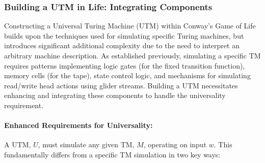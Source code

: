 \documentclass{article}
\theoremstyle{definition}
\theoremstyle{plain}
\theoremstyle{plain}
\begin{document}
\subsubsection{Building a UTM in Life: Integrating Components}
Constructing a Universal Turing Machine (UTM) within Conway's Game of Life builds upon the techniques used for simulating specific Turing machines, but introduces significant additional complexity due to the need to interpret an arbitrary machine description. As established previously, simulating a specific TM requires patterns implementing logic gates (for the fixed transition function), memory cells (for the tape), state control logic, and mechanisms for simulating read/write head actions using glider streams. Building a UTM necessitates enhancing and integrating these components to handle the universality requirement.

\paragraph{Enhanced Requirements for Universality:}
A UTM, $U$, must simulate any given TM, $M$, operating on input $w$. This fundamentally differs from a specific TM simulation in two key ways:
\end{document}
